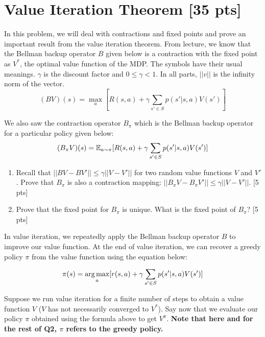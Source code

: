 \section{Value Iteration Theorem [35 pts]}



In this problem, we will deal with contractions and fixed points and prove an important result from the value iteration theorem.
From lecture, we know that the Bellman backup operator $B$ given below is a contraction with the fixed point as $V^*$, the optimal value function of the MDP. The symbols have their usual meanings. $\gamma$ is the discount factor and $0 \leq \gamma < 1$. In all parts, $||v||$ is the infinity norm of the vector.
\begin{equation}
    (BV)(s) = \max_a[ R(s, a) + \gamma\sum_{s' \in S}p(s'|s,a)V(s')]
\end{equation}

We also saw the contraction operator $B_\pi$ which is the Bellman backup operator for a particular policy given below:
\begin{equation}
    (B_\pi V)(s) =  \mathbb E_{a \sim \pi}[R(s,a) + \gamma\sum_{s' \in S}p(s'|s,a)V(s')]
\end{equation}

\begin{enumerate}[label=(\alph*)]
    \item Recall that $||BV - BV'|| \leq \gamma ||V - V'||$ for two random value functions $V$ and $V'$. Prove that $B_\pi$ is also a contraction mapping:  $||B_\pi V - B_\pi V'|| \leq \gamma ||V - V'||$. [5 pts]
    \item Prove that the fixed point for $B_\pi$ is unique. What is the fixed point of $B_\pi$? [5 pts]
\end{enumerate}

\noindent In value iteration, we repeatedly apply the Bellman backup operator $B$ to improve our value function. At the end of value iteration, we can recover a greedy policy $\pi$ from the value function using the equation below:

\begin{equation}
    \pi(s) = \operatorname*{arg\,max}_{a} [{r(s,a) + \gamma\sum_{s' \in S}p(s'|s,a)V(s')}]
\end{equation}

\noindent Suppose we run value iteration for a finite number of steps to obtain a value function $V$ ($V$ has not necessarily converged to $V^*$). Say now that we evaluate our policy $\pi$ obtained using the formula above to get $V^\pi$. \textbf{Note that here and for the rest of Q2, $\pi$ refers to the greedy policy.}

